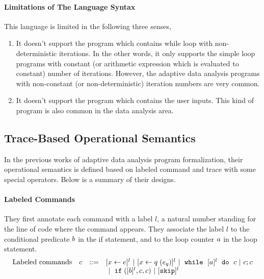 \paragraph*{Limitations of The Language Syntax}
This language is limited in the following three senses,
\begin{enumerate}
\item  It doesn't support the program which contains while loop with non-deterministic iterations.
In the other words, it only supports the simple loop programs with
constant (or arithmetic expression which is evaluated to constant) number of iterations.
However, the adaptive data analysis programs with non-constant (or non-deterministic) iteration numbers are very common.
%
\item  It doesn't support the program which contains the user inputs.
This kind of program is also common in the data analysis area.
\end{enumerate}
%
\subsection*{Trace-Based Operational Semantics}
In the previous works of adaptive data analysis program formalization,
their operational semantics is defined based on labeled command and trace with some special operators.
Below is a summary of their designs.
\paragraph*{Labeled Commands}
They first annotate each command with a label $l$,
a natural number standing for the line of code where the command appears.
They associate the label $l$ to the conditional predicate $b$ in the if statement,
and to the loop counter $a$ in the loop statement.
\[
\begin{array}{llll}
     \mbox{Labeled commands} & c & ::= &   [\mathrel{ x \leftarrow e }]^{l} ~|~  [\mathrel{ x \leftarrow q }(e_q)]^{l}
 ~|~  \;\mathtt{while}\; ~ [a]^{l} ~ \;\mathtt{do}\; ~ c  ~|~ c;c \\
 & & & ~|~ \;\mathtt{if}\;([b]^l, c, c) 	 ~|~ [\mathtt{skip}]^{l} \\
\end{array}
\]
